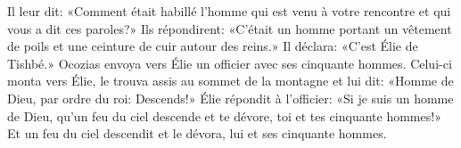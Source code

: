 Il leur dit: «Comment était habillé l’homme qui est venu à votre rencontre
	et qui vous a dit ces paroles?»
Ils répondirent: «C’était un homme portant un vêtement de poils
	et une ceinture de cuir autour des reins.»
Il déclara: «C’est Élie de Tishbé.»
Ocozias envoya vers Élie un officier avec ses cinquante hommes.
Celui-ci monta vers Élie, le trouva assis au sommet de la montagne et lui dit:
	«Homme de Dieu, par ordre du roi: Descends!»
Élie répondit à l’officier:
	«Si je suis un homme de Dieu,
	qu’un feu du ciel descende et te dévore, toi et tes cinquante hommes!»
	Et un feu du ciel descendit et le dévora, lui et ses cinquante hommes.
